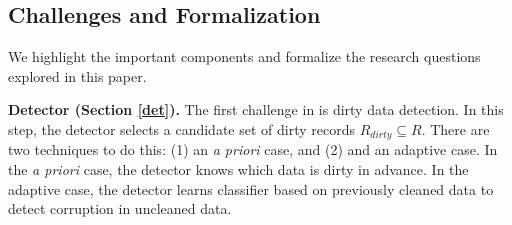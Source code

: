 \iffalse
  \noindent To summarize in pseudocode:
  \begin{enumerate}[leftmargin=1em]\scriptsize\sloppy
  \item \texttt{Init(dirty\_data, cleaned\_data, dirty\_model, batch, iter)}
  \item For each t in $\{1,...,T\}$
  \begin{enumerate}
    \item \texttt{dirty\_sample $=$ Sampler(dirty\_data, sample\_prob, detector, batch)}
    \item \texttt{clean\_sample $=$ Cleaner(dirty\_sample)}
    \item \texttt{current\_model $=$ Update(current\_model, sample\_prob, clean\_sample)}
    \item \texttt{cleaned\_data = cleaned\_data + clean\_sample}
    \item \texttt{dirty\_data = dirty\_data - clean\_sample}
    \item \texttt{sample\_prob $=$ Estimator(dirty\_data, cleaned\_data, detector)}
    \item \texttt{detector $=$ DetectorUpdater(detector, cleaned\_data)}
  \end{enumerate}
  \item \texttt{Output: current\_model}
  \end{enumerate}
\fi


\iffalse
  \subsection{Challenges and Formalization}
  We highlight the important components and formalize the research questions explored in this paper. 

  \vspace{0.5em}

  \noindent\textbf{Detector (Section \ref{det}). } The first challenge in \sys is dirty data detection. In this step, the detector selects a candidate set of dirty records $R_{dirty} \subseteq R$. There are two techniques to do this: (1) an \emph{a priori} case, and (2) and an adaptive case. In the \emph{a priori} case, the detector knows which data is dirty in advance. In the adaptive case, the detector learns classifier based on previously cleaned data to detect corruption in uncleaned data.

  \vspace{0.5em}



  \vspace{0.5em}



